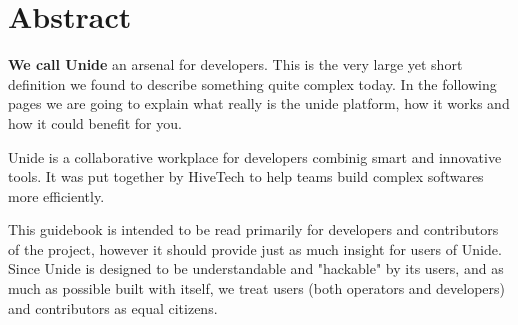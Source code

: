 \section*{Abstract}

\textbf{We call Unide} an arsenal for developers. This is the very large yet
short definition we found to describe something quite complex today. In the
following pages we are going to explain what really is the unide platform, how
it works and how it could benefit for you.
\newline

Unide is a collaborative workplace for developers combinig smart and innovative
tools. It was put together by HiveTech to help teams build complex softwares
more efficiently.
\newline

This guidebook is intended to be read primarily for developers and contributors
of the project, however it should provide just as much insight for users of
Unide. Since Unide is designed to be understandable and "hackable" by its
users, and as much as possible built with itself, we treat users (both
operators and developers) and contributors as equal citizens.
